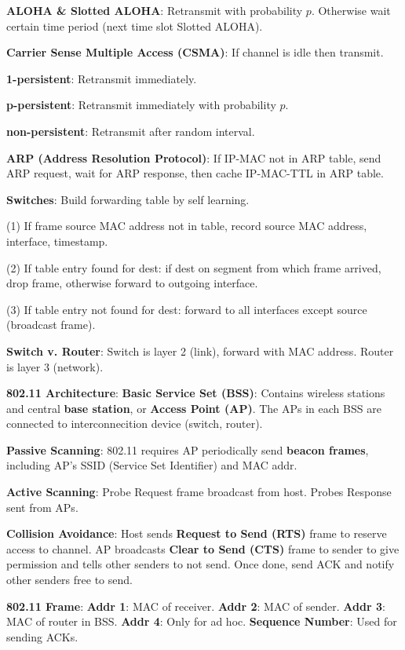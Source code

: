 \documentclass{scrartcl}
\begin{document}
\begin{multicols*}{3}
{\bf ALOHA \& Slotted ALOHA}: Retransmit with probability $p$. Otherwise wait certain time period (next time slot Slotted ALOHA).


{\bf Carrier Sense Multiple Access (CSMA)}: If channel is idle then transmit.

{\bf 1-persistent}: Retransmit immediately.

{\bf p-persistent}: Retransmit immediately with probability $p$.

{\bf non-persistent}: Retransmit after random interval.


{\bf ARP (Address Resolution Protocol)}: If IP-MAC not in ARP table, send ARP request, wait for ARP response, then cache IP-MAC-TTL in ARP table.


{\bf Switches}: Build forwarding table by self learning.

(1) If frame source MAC address not in table, record source MAC address, interface, timestamp.

(2) If table entry found for dest: if dest on segment from which frame arrived, drop frame, otherwise forward to outgoing interface.

(3) If table entry not found for dest: forward to all interfaces except source (broadcast frame).


{\bf Switch v. Router}: Switch is layer 2 (link), forward with MAC address. Router is layer 3 (network).


{\bf 802.11 Architecture}:
{\bf Basic Service Set (BSS)}: Contains wireless stations and central {\bf base station}, or {\bf Access Point (AP)}. The APs in each BSS are connected to interconnecition device (switch, router).

{\bf Passive Scanning}: 802.11 requires AP periodically send {\bf  beacon frames}, including AP's SSID (Service Set Identifier) and MAC addr.

{\bf Active Scanning}: Probe Request frame broadcast from host. Probes Response sent from APs.

{\bf Collision Avoidance}: Host sends {\bf Request to Send (RTS)} frame to reserve access to channel. AP broadcasts {\bf Clear to Send (CTS)} frame to sender to give permission and tells other senders to not send. Once done, send ACK and notify other senders free to send.

{\bf 802.11 Frame}: {\bf Addr 1}: MAC of receiver. {\bf Addr 2}: MAC of sender. {\bf Addr 3}: MAC of router in BSS. {\bf Addr 4}: Only for ad hoc. {\bf Sequence Number}: Used for sending ACKs. 



\end{multicols*}
\end{document}
